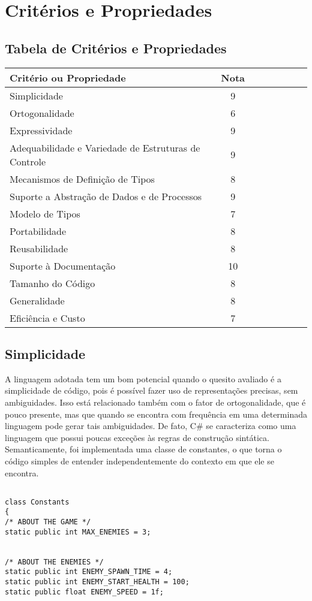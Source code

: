 \documentclass[rel_mlp]{iiufrgs}
\begin{document}
\section{Critérios e Propriedades}

\subsection{Tabela de Critérios e Propriedades}

    \begin{tabular}{l*{6}{c}r}
    Critério ou Propriedade & Nota \\
		\hline
		Simplicidade & 9 \\ 
		Ortogonalidade & 6 \\
		Expressividade & 9 \\
		Adequabilidade e Variedade de Estruturas de Controle & 9 \\
		Mecanismos de Definição de Tipos & 8 \\
		Suporte a Abstração de Dados e de Processos & 9 \\
		Modelo de Tipos & 7 \\
		Portabilidade & 8 \\
		Reusabilidade & 8 \\
		Suporte à Documentação & 10 \\
		Tamanho do Código & 8 \\
		Generalidade & 8 \\
		Eficiência e Custo & 7
    \end{tabular}

\subsection{Simplicidade}

A linguagem adotada tem um bom potencial quando o quesito avaliado é 	a simplicidade de código, pois é possível fazer uso de 	representações precisas, sem ambiguidades. Isso está relacionado também com o fator de ortogonalidade, que é pouco presente, mas que quando se encontra com frequência em uma determinada linguagem pode gerar tais ambiguidades. De fato, C\# se caracteriza como uma linguagem que possui poucas exceções às regras de construção sintática. Semanticamente, foi implementada uma classe de constantes, o que torna o código simples de entender independentemente do contexto em que ele se encontra.

\begin{lstlisting}[caption=Trecho de código C\# retirado da implementação deste trabalho, label=lst:test]

class Constants
{
/* ABOUT THE GAME */
static public int MAX_ENEMIES = 3;


/* ABOUT THE ENEMIES */
static public int ENEMY_SPAWN_TIME = 4;
static public int ENEMY_START_HEALTH = 100;
static public float ENEMY_SPEED = 1f;

\end{lstlisting}
\end{document}
